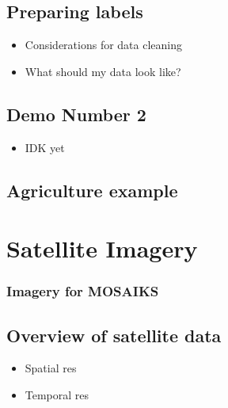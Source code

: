 \documentclass[
  letterpaper,
  DIV=11,
  numbers=noendperiod]{scrreprt}
\providecommand{\tightlist}{%
  \setlength{\itemsep}{0pt}\setlength{\parskip}{0pt}}\usepackage{longtable,booktabs,array}
\begin{document}
\hypertarget{preparing-labels}{%
\chapter{Preparing labels}\label{preparing-labels}}

\begin{itemize}
\tightlist
\item
  Considerations for data cleaning
\item
  What should my data look like?
\end{itemize}

\hypertarget{demo-number-2}{%
\chapter{Demo Number 2}\label{demo-number-2}}

\begin{itemize}
\tightlist
\item
  IDK yet
\end{itemize}

\hypertarget{agriculture-example}{%
\chapter{Agriculture example}\label{agriculture-example}}

\part{Satellite Imagery}

\hypertarget{imagery-for-mosaiks}{%
\section*{Imagery for MOSAIKS}\label{imagery-for-mosaiks}}


\hypertarget{overview-of-satellite-data}{%
\chapter{Overview of satellite data}\label{overview-of-satellite-data}}

\begin{itemize}
\tightlist
\item
  Spatial res
\item
  Temporal res
\end{itemize}
\end{document}
